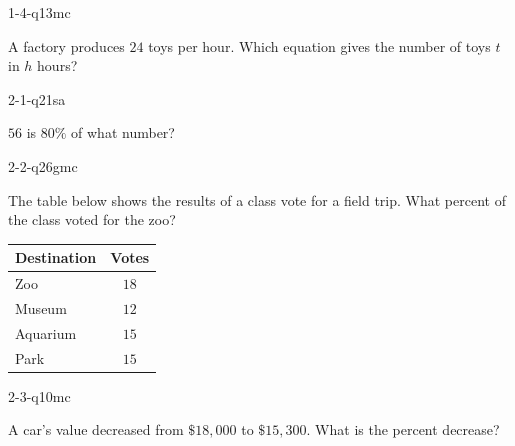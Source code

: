 
\begin{practiceQuestion}{1-4-q13}{mc}
\begin{questionText}
A factory produces $24$ toys per hour. Which equation gives the number of toys $t$ in $h$ hours?
\end{questionText}
\end{practiceQuestion}

\begin{practiceQuestion}{2-1-q21}{sa}
\begin{questionText}
$56$ is $80\%$ of what number?
\end{questionText}
\end{practiceQuestion}

\begin{practiceQuestion}{2-2-q26}{gmc}
\begin{questionText}
The table below shows the results of a class vote for a field trip. What percent of the class voted for the zoo?

\begin{center}
\begin{tabular}{|l|c|}
\hline
\textbf{Destination} & \textbf{Votes} \\
\hline
Zoo & $18$ \\
\hline
Museum & $12$ \\
\hline
Aquarium & $15$ \\
\hline
Park & $15$ \\
\hline
\end{tabular}
\end{center}
\end{questionText}
\end{practiceQuestion}

\begin{practiceQuestion}{2-3-q10}{mc}
\begin{questionText}
A car's value decreased from $\$18{,}000$ to $\$15{,}300$. What is the percent decrease?
\end{questionText}
\end{practiceQuestion}

